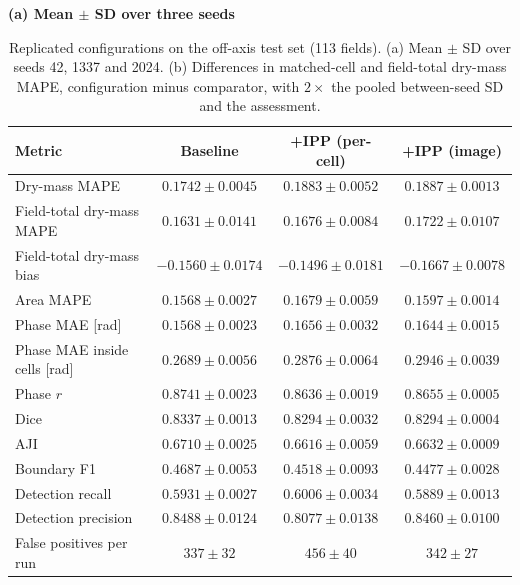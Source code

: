 \begin{table}[!htbp]
\centering
\caption{Replicated configurations on the off-axis test set (113 fields). (a)
Mean $\pm$ SD over seeds 42, 1337 and 2024. (b) Differences in matched-cell and
field-total dry-mass MAPE, configuration minus comparator, with $2\times$ the pooled between-seed SD
and the assessment.}
\label{tab:seeds}
\footnotesize
\textbf{(a) Mean $\pm$ SD over three seeds}\\[2pt]
\begin{tabular*}{\textwidth}{@{\extracolsep{\fill}}lccc@{}}
\toprule
Metric & Baseline & +IPP (per-cell) & +IPP (image) \\
\midrule
Dry-mass MAPE & $0.1742 \pm 0.0045$ & $0.1883 \pm 0.0052$ & $0.1887 \pm 0.0013$ \\
Field-total dry-mass MAPE & $0.1631 \pm 0.0141$ & $0.1676 \pm 0.0084$ & $0.1722 \pm 0.0107$ \\
Field-total dry-mass bias & $-0.1560 \pm 0.0174$ & $-0.1496 \pm 0.0181$ & $-0.1667 \pm 0.0078$ \\
Area MAPE & $0.1568 \pm 0.0027$ & $0.1679 \pm 0.0059$ & $0.1597 \pm 0.0014$ \\
Phase MAE [rad] & $0.1568 \pm 0.0023$ & $0.1656 \pm 0.0032$ & $0.1644 \pm 0.0015$ \\
Phase MAE inside cells [rad] & $0.2689 \pm 0.0056$ & $0.2876 \pm 0.0064$ & $0.2946 \pm 0.0039$ \\
Phase $r$ & $0.8741 \pm 0.0023$ & $0.8636 \pm 0.0019$ & $0.8655 \pm 0.0005$ \\
Dice & $0.8337 \pm 0.0013$ & $0.8294 \pm 0.0032$ & $0.8294 \pm 0.0004$ \\
AJI & $0.6710 \pm 0.0025$ & $0.6616 \pm 0.0059$ & $0.6632 \pm 0.0009$ \\
Boundary F1 & $0.4687 \pm 0.0053$ & $0.4518 \pm 0.0093$ & $0.4477 \pm 0.0028$ \\
Detection recall & $0.5931 \pm 0.0027$ & $0.6006 \pm 0.0034$ & $0.5889 \pm 0.0013$ \\
Detection precision & $0.8488 \pm 0.0124$ & $0.8077 \pm 0.0138$ & $0.8460 \pm 0.0100$ \\
False positives per run & $337 \pm 32$ & $456 \pm 40$ & $342 \pm 27$ \\
\bottomrule
\end{tabular*}


\end{table}
